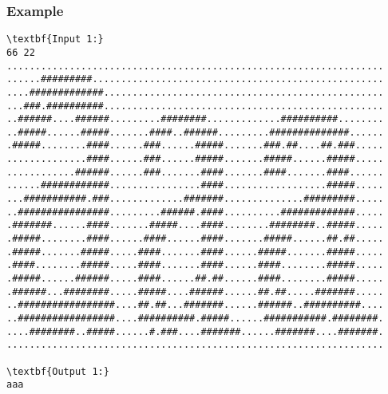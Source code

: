 \subsubsection{   Example  }
\begin{verbatim}
\textbf{Input 1:}
66 22
..................................................................
......#########...................................................
....#############.................................................
...###.##########.................................................
..######....######.........########.............##########........
..#####......#####.......####..######.........##############......
.#####........####......###......#####.......###.##....##.###.....
..............####......###......#####.......#####......#####.....
............######......###.......####.......####.......####......
......############................####..................#####.....
...###########.###.............#######..............#########.....
..################.........######.####..........#############.....
.#######......####.......#####....####........########..#####.....
.#####........####......####......####.......#####......##.##.....
.#####.......#####.....####.......####......#####.......#####.....
.####........#####.....####.......####......####........#####.....
.#####......######.....####......##.##......####........#####.....
.######...########.....#####....######......##.##.....#######.....
..#################....##.##...#######......######..##########....
..#################....##########.#####......###########.########.
....########..#####......#.###....#######......#######....#######.
..................................................................

\textbf{Output 1:}
aaa


\end{verbatim}
